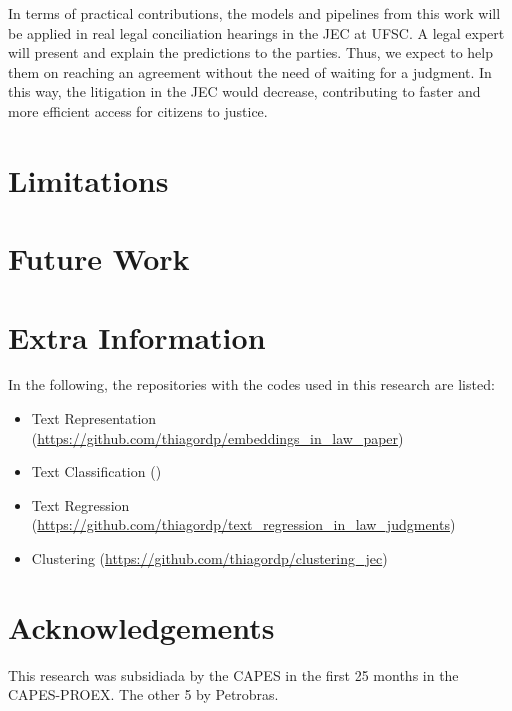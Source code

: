 In terms of practical contributions, the models and pipelines from this work will be applied in real legal conciliation hearings in the JEC at UFSC. A legal expert will present and explain the predictions to the parties. Thus, we expect to help them on reaching an agreement without the need of waiting for a judgment. In this way, the litigation in the JEC would decrease, contributing to faster and more efficient access for citizens to justice.



\section{Limitations}

\section{Future Work}



\section{Extra Information}

In the following,  the repositories with the codes used in this research are listed:

\begin{itemize}    [noitemsep]
    \item Text Representation (\url{https://github.com/thiagordp/embeddings_in_law_paper})
    \item Text Classification (\url{})
    \item Text Regression  (\url{https://github.com/thiagordp/text_regression_in_law_judgments})
    \item Clustering (\url{https://github.com/thiagordp/clustering_jec})
\end{itemize}

\section{Acknowledgements}

This research was subsidiada by the CAPES in the first 25 months in the CAPES-PROEX. The other 5 by Petrobras.